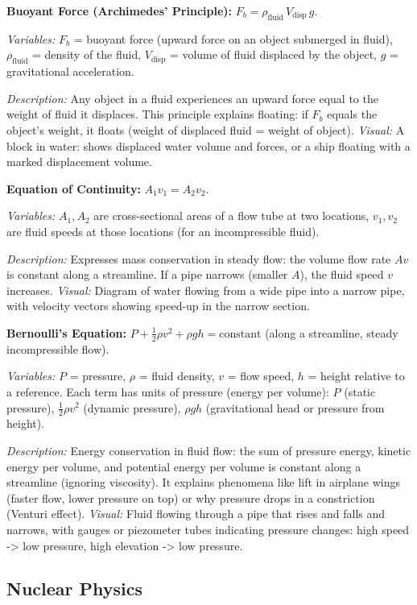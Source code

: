 \documentclass{article}
\begin{document}
\textbf{Buoyant Force (Archimedes’ Principle):} $F_b = \rho_{\text{fluid}}\, V_{\text{disp}}\, g$.

\textit{Variables:} $F_b$ = buoyant force (upward force on an object submerged in fluid), $\rho_{\text{fluid}}$ = density of the fluid, $V_{\text{disp}}$ = volume of fluid displaced by the object, $g$ = gravitational acceleration.

\textit{Description:} Any object in a fluid experiences an upward force equal to the weight of fluid it displaces. This principle explains floating: if $F_b$ equals the object’s weight, it floats (weight of displaced fluid = weight of object). \textit{Visual:} A block in water: shows displaced water volume and forces, or a ship floating with a marked displacement volume.

\textbf{Equation of Continuity:} $A_1 v_1 = A_2 v_2$.

\textit{Variables:} $A_1, A_2$ are cross-sectional areas of a flow tube at two locations, $v_1, v_2$ are fluid speeds at those locations (for an incompressible fluid).

\textit{Description:} Expresses mass conservation in steady flow: the volume flow rate $A v$ is constant along a streamline. If a pipe narrows (smaller $A$), the fluid speed $v$ increases. \textit{Visual:} Diagram of water flowing from a wide pipe into a narrow pipe, with velocity vectors showing speed-up in the narrow section.

\textbf{Bernoulli’s Equation:} $P + \tfrac{1}{2}\rho v^2 + \rho g h = \text{constant}$ (along a streamline, steady incompressible flow).

\textit{Variables:} $P$ = pressure, $\rho$ = fluid density, $v$ = flow speed, $h$ = height relative to a reference. Each term has units of pressure (energy per volume): $P$ (static pressure), $\frac{1}{2}\rho v^2$ (dynamic pressure), $\rho g h$ (gravitational head or pressure from height).

\textit{Description:} Energy conservation in fluid flow: the sum of pressure energy, kinetic energy per volume, and potential energy per volume is constant along a streamline (ignoring viscosity). It explains phenomena like lift in airplane wings (faster flow, lower pressure on top) or why pressure drops in a constriction (Venturi effect). \textit{Visual:} Fluid flowing through a pipe that rises and falls and narrows, with gauges or piezometer tubes indicating pressure changes: high speed -> low pressure, high elevation -> low pressure.

\subsection*{Nuclear Physics}
\end{document}
